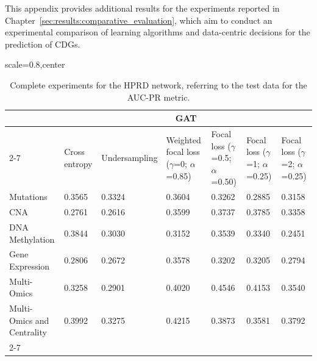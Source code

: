 \documentclass[ppgc, diss, english]{iiufrgs}
\begin{document}
This appendix provides additional results for the experiments reported in Chapter~\ref{sec:results:comparative_evaluation}, which aim to conduct an experimental comparison of learning algorithms and data-centric decisions for the prediction of CDGs.


\begin{landscape}

\begin{table}[!th]
\caption{Complete experiments for the HPRD network, referring to the test data for the AUC-PR metric. \label{tab:completa_hprd}}
\centering
 \begin{adjustbox}{scale=0.8,center}

\begin{tabular}{lllllll}
\hline
                           & \multicolumn{6}{c}{\textbf{GAT}}                                                                                                                              \\ \cline{2-7} 
                           & Cross entropy & Undersampling & Weighted focal loss ($\gamma$=0; $\alpha$=0.85) & Focal loss ($\gamma$=0.5; $\alpha$=0.50) & Focal loss ($\gamma$=1; $\alpha$=0.25) & Focal loss ($\gamma$=2; $\alpha$=0.25) \\
Mutations                  & 0.3565        & 0.3324        & 0.3604                            & 0.3262                     & 0.2885                   & 0.3158                   \\
CNA                        & 0.2761        & 0.2616        & 0.3599                            & 0.3737                     & 0.3785                   & 0.3358                   \\
DNA Methylation            & 0.3844        & 0.3030        & 0.3152                            & 0.3539                     & 0.3340                   & 0.2451                   \\
Gene Expression            & 0.2806        & 0.2672        & 0.3578                            & 0.3202                     & 0.3205                   & 0.2794                   \\
Multi-Omics                & 0.3258        & 0.2901        & 0.4020                            & 0.4546                     & 0.4153                   & 0.3540                   \\
Multi-Omics and Centrality & 0.3992        & 0.3275        & 0.4215                            & 0.3873                     & 0.3581                   & 0.3792                   \\ \cline{2-7} 

\end{tabular}
\end{adjustbox}
\end{table}
\end{landscape}
\end{document}
